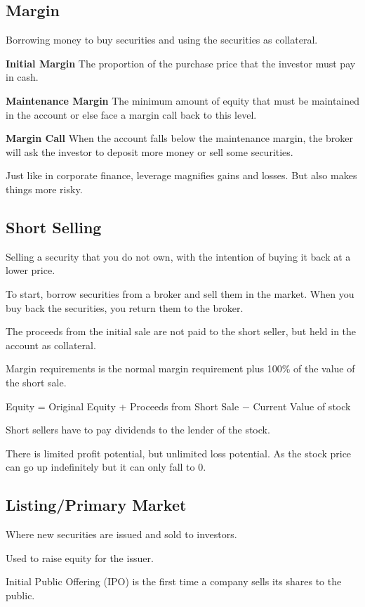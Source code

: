 \subsection{Margin}
Borrowing money to buy securities and using the securities as collateral.

\textbf{Initial Margin}
The proportion of the purchase price that the investor must pay in cash.

\textbf{Maintenance Margin}
The minimum amount of equity that must be maintained in the account or else face a margin call back to this level.

\textbf{Margin Call}
When the account falls below the maintenance margin, the broker will ask the investor to deposit more money or sell some securities.

Just like in corporate finance, leverage magnifies gains and losses. But also makes things more risky.

\subsection{Short Selling}
Selling a security that you do not own, with the intention of buying it back at a lower price.

To start, borrow securities from a broker and sell them in the market.
When you buy back the securities, you return them to the broker.

The proceeds from the initial sale are not paid to the short seller, but held in the account as collateral.

Margin requirements is the normal margin requirement plus 100\% of the value of the short sale.

Equity = Original Equity + Proceeds from Short Sale $-$ Current Value of stock

Short sellers have to pay dividends to the lender of the stock.

There is limited profit potential, but unlimited loss potential. As the stock price can go up indefinitely but it can only fall to 0.

\subsection{Listing/Primary Market}
Where new securities are issued and sold to investors.

Used to raise equity for the issuer.

Initial Public Offering (IPO) is the first time a company sells its shares to the public.

